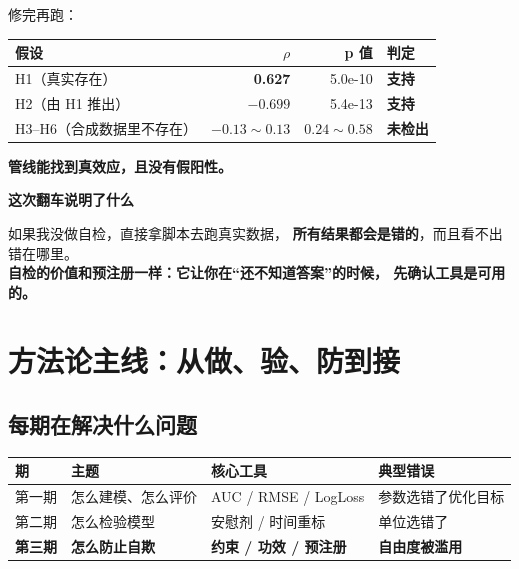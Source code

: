 \documentclass[UTF8,a4paper,11pt]{ctexart}
\newenvironment{explainbox}[1]
{\begin{center}\begin{minipage}{0.94\textwidth}\colorbox{boxbg}{\parbox{0.92\textwidth}{\textbf{#1}\par\vspace{2pt}}}}
{\end{minipage}\end{center}}
\begin{document}
修完再跑：

\begin{center}
\begin{tabular}{p{4.0cm}rrl}
\toprule
\textbf{假设} & \textbf{$\rho$} & \textbf{p 值} & \textbf{判定} \\
\midrule
H1（真实存在） & \textbf{0.627} & 5.0e-10 & \textbf{支持} \\
H2（由 H1 推出） & $-0.699$ & 5.4e-13 & \textbf{支持} \\
H3--H6（合成数据里不存在） & $-0.13 \sim 0.13$ & $0.24 \sim 0.58$ & \textbf{未检出} \\
\bottomrule
\end{tabular}
\end{center}

\textbf{管线能找到真效应，且没有假阳性。}

\begin{explainbox}{这次翻车说明了什么}
如果我没做自检，直接拿脚本去跑真实数据，
\textbf{所有结果都会是错的}，而且看不出错在哪里。\\[4pt]
\textbf{自检的价值和预注册一样：它让你在“还不知道答案”的时候，
先确认工具是可用的。}
\end{explainbox}

\newpage


\section{方法论主线：从做、验、防到接}

\subsection{每期在解决什么问题}

\begin{longtable}{@{}p{1.6cm}p{4.6cm}p{4.4cm}p{3.2cm}@{}}
\toprule
\textbf{期} & \textbf{主题} & \textbf{核心工具} & \textbf{典型错误} \\
\midrule
第一期 & 怎么建模、怎么评价 & AUC / RMSE / LogLoss & 参数选错了优化目标 \\
第二期 & 怎么检验模型 & 安慰剂 / 时间重标 & 单位选错了 \\
\textbf{第三期} & \textbf{怎么防止自欺} & \textbf{约束 / 功效 / 预注册} & \textbf{自由度被滥用} \\
\bottomrule
\end{longtable}
\end{document}
